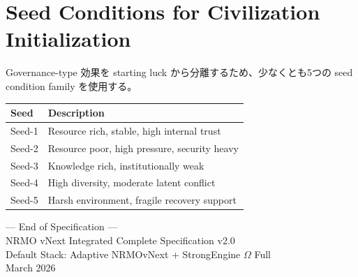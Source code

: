 \documentclass[11pt,a4paper]{article}
\theoremstyle{definition}\newtheorem{definition}{Definition}[section]
\begin{document}
\section{Seed Conditions for Civilization Initialization}

Governance-type 効果を starting luck から分離するため、少なくとも5つの seed condition family を使用する。

\begin{table}[H]\centering\small
\begin{tabular}{@{}lp{8cm}@{}}\toprule
Seed&Description\\\midrule
Seed-1&Resource rich, stable, high internal trust\\
Seed-2&Resource poor, high pressure, security heavy\\
Seed-3&Knowledge rich, institutionally weak\\
Seed-4&High diversity, moderate latent conflict\\
Seed-5&Harsh environment, fragile recovery support\\
\bottomrule\end{tabular}
\end{table}

\vfill\begin{center}\small\sffamily\color{ngr}
--- End of Specification ---\\
NRMO vNext Integrated Complete Specification v2.0\\
Default Stack: Adaptive NRMOvNext + StrongEngine $\Omega$ Full\\
March 2026
\end{center}
\end{document}
